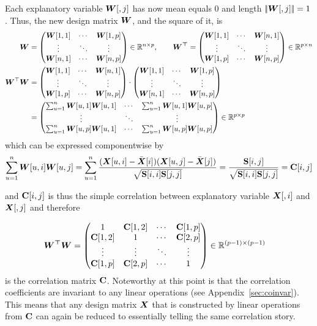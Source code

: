 \documentclass[11pt,a4paper,twoside]{book}\usepackage[]{graphicx}\usepackage[]{xcolor}
\begin{document}
Each explanatory variable ${\boldsymbol{W}}[,j]$ has now mean equals 0 and length $|\!|{\boldsymbol{W}}[,j]|\!|=1$. Thus, the new design matrix ${\boldsymbol{W}}$, and the square of it, is
\begin{align*}
{\boldsymbol{W}}&=\begin{pmatrix}
{\boldsymbol{W}}[1,1] & \cdots & {\boldsymbol{W}}[1,p]\\
\vdots & \ddots & \vdots\\
{\boldsymbol{W}}[n,1] & \cdots & {\boldsymbol{W}}[n,p]
\end{pmatrix}\in {\mathbb{R}}^{n\times p},\qquad
\boldsymbol{{\boldsymbol{W}}^\top}=\begin{pmatrix}
{\boldsymbol{W}}[1,1] & \cdots & {\boldsymbol{W}}[n,1]\\
\vdots & \ddots & \vdots\\
{\boldsymbol{W}}[1,p] & \cdots & {\boldsymbol{W}}[n,p]
\end{pmatrix} \in {\mathbb{R}}^{p\times n}\\
{\boldsymbol{W}}^\top {\boldsymbol{W}}&=
\begin{pmatrix}
{\boldsymbol{W}}[1,1] & \cdots & {\boldsymbol{W}}[n,1]\\
\vdots & \ddots & \vdots\\
{\boldsymbol{W}}[1,p] & \cdots & {\boldsymbol{W}}[n,p]
\end{pmatrix}\cdot
\begin{pmatrix}
{\boldsymbol{W}}[1,1] & \cdots & {\boldsymbol{W}}[1,p]\\
\vdots & \ddots & \vdots\\
{\boldsymbol{W}}[n,1] & \cdots & {\boldsymbol{W}}[n,p]
\end{pmatrix}
\\&=
\begin{pmatrix}
\sum_{u=1}^{n}{\boldsymbol{W}}[u,1]{\boldsymbol{W}}[u,1]& \cdots & \sum_{u=1}^{n}{\boldsymbol{W}}[u,1]{\boldsymbol{W}}[u,p]\\
\vdots & \ddots & \vdots\\
\sum_{u=1}^{n}{\boldsymbol{W}}[u,p]{\boldsymbol{W}}[u,1]& \cdots & \sum_{u=1}^{n}{\boldsymbol{W}}[u,p]{\boldsymbol{W}}[u,p]\\
\end{pmatrix}
\in {\mathbb{R}}^{p\times p}
\end{align*}
which can be expressed componentwise by
\begin{align*}
\sum_{u=1}^{n}{\boldsymbol{W}}[u,i]{\boldsymbol{W}}[u,j]=\sum_{u=1}^{n} \frac{({\boldsymbol{X}}[u,i]-\bar{{\boldsymbol{X}}}[i])({\boldsymbol{X}}[u,j]-\bar{{\boldsymbol{X}}}[j])}{\sqrt{{\mathbf{S}}[i,i]{\mathbf{S}}[j,j]}}=\frac{{\mathbf{S}}[i,j]}{\sqrt{{\mathbf{S}}[i,i]{\mathbf{S}}[j,j]}}={\mathbf{C}}[i,j]
\end{align*}

and ${\mathbf{C}}[i,j]$ is thus the simple correlation between explanatory variable ${\boldsymbol{X}}[,i]$ and ${\boldsymbol{X}}[,j]$ and therefore

\begin{align*}
\boldsymbol{W^\top W}&=\begin{pmatrix}
1      & {\mathbf{C}}[1,2] & \cdots &  {\mathbf{C}}[1,p]\\
{\mathbf{C}}[1,2] & 1      & \cdots &  {\mathbf{C}}[2,p]\\
\vdots & \vdots & \ddots &  \vdots\\
{\mathbf{C}}[1,p] & {\mathbf{C}}[2,p] & \cdots &  1
\end{pmatrix}
\in{\mathbb{R}}^{(p-1)\times(p-1)}
\end{align*}
is the correlation matrix ${\mathbf{C}}$. Noteworthy at this point is that the correlation coefficients are invariant to any linear operations (see Appendix~\ref{sec:coinvar}). This means that any design matrix ${\boldsymbol{X}}$ that is constructed by linear operations from ${\mathbf{C}}$ can again be reduced to essentially telling the same correlation story.
\end{document}
